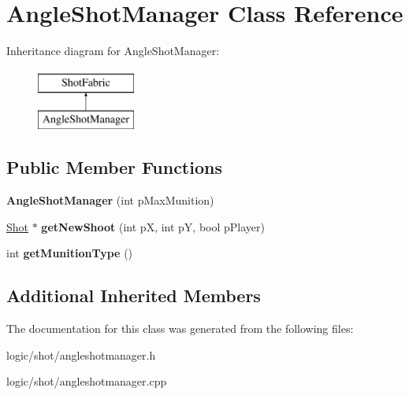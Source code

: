 \hypertarget{class_angle_shot_manager}{\section{Angle\-Shot\-Manager Class Reference}
\label{class_angle_shot_manager}
}
Inheritance diagram for Angle\-Shot\-Manager\-:\begin{figure}[H]
\begin{center}
\leavevmode
\includegraphics[height=2.000000cm]{class_angle_shot_manager}
\end{center}
\end{figure}
\subsection*{Public Member Functions}
\begin{DoxyCompactItemize}
\item 
\hypertarget{class_angle_shot_manager_a54c7a8671c85d42273c716a66a699824}{{\bfseries Angle\-Shot\-Manager} (int p\-Max\-Munition)}\label{class_angle_shot_manager_a54c7a8671c85d42273c716a66a699824}

\item 
\hypertarget{class_angle_shot_manager_ab572dadf520c29aca5f563f88cc8655d}{\hyperlink{class_shot}{Shot} $\ast$ {\bfseries get\-New\-Shoot} (int p\-X, int p\-Y, bool p\-Player)}\label{class_angle_shot_manager_ab572dadf520c29aca5f563f88cc8655d}

\item 
\hypertarget{class_angle_shot_manager_ab7a210ac59c662552496f301d52a3ec0}{int {\bfseries get\-Munition\-Type} ()}\label{class_angle_shot_manager_ab7a210ac59c662552496f301d52a3ec0}

\end{DoxyCompactItemize}
\subsection*{Additional Inherited Members}


The documentation for this class was generated from the following files\-:\begin{DoxyCompactItemize}
\item 
logic/shot/angleshotmanager.\-h\item 
logic/shot/angleshotmanager.\-cpp\end{DoxyCompactItemize}
